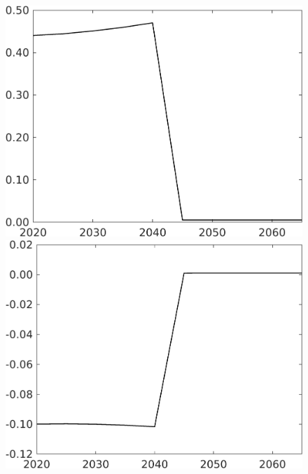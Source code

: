 \begin{figure}[h!!!]
\begin{minipage}[]{0.32\textwidth}
		\includegraphics[width=1\textwidth]{../../codding_model/own_basedOnFried/optimalPol_010922_revision/figures/all_13Sept22_Tplus30/gAg_OPT_COMPtaulPer_regime4_spillover0_knspil1_noskill1_sep0_xgrowth0_PV1_etaa0.79.png}
	\end{minipage}
	\begin{minipage}[]{0.32\textwidth}
		\includegraphics[width=1\textwidth]{../../codding_model/own_basedOnFried/optimalPol_010922_revision/figures/all_13Sept22_Tplus30/gAn_OPT_COMPtaulPer_regime4_spillover0_knspil1_noskill1_sep0_xgrowth0_PV1_etaa0.79.png}

\end{minipage}
\end{figure}
